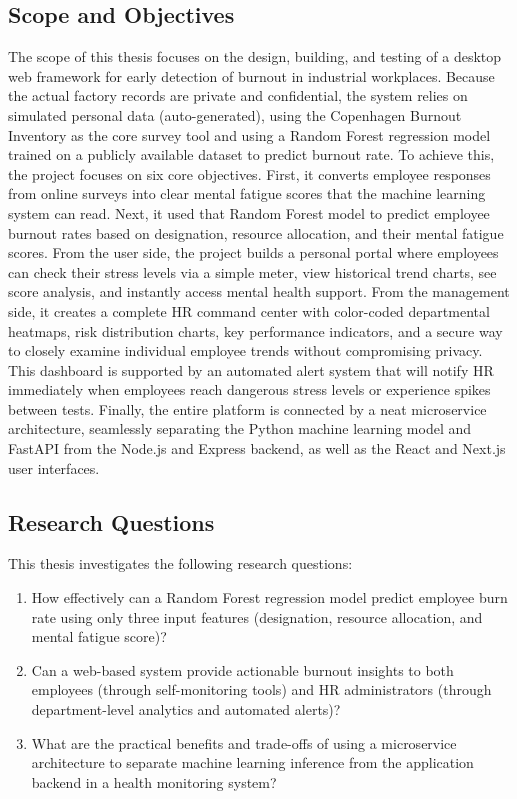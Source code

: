 \documentclass[12pt,a4paper]{article}
\begin{document}
\subsection{Scope and Objectives}

The scope of this thesis focuses on the design, building, and testing of a desktop web framework for early detection of burnout in industrial workplaces. Because the actual factory records are private and confidential, the system relies on simulated personal data (auto-generated), using the Copenhagen Burnout Inventory as the core survey tool and using a Random Forest regression model trained on a publicly available dataset to predict burnout rate. To achieve this, the project focuses on six core objectives. First, it converts employee responses from online surveys into clear mental fatigue scores that the machine learning system can read. Next, it used that Random Forest model to predict employee burnout rates based on designation, resource allocation, and their mental fatigue scores. From the user side, the project builds a personal portal where employees can check their stress levels via a simple meter, view historical trend charts, see score analysis, and instantly access mental health support. From the management side, it creates a complete HR command center with color-coded departmental heatmaps, risk distribution charts, key performance indicators, and a secure way to closely examine individual employee trends without compromising privacy. This dashboard is supported by an automated alert system that will notify HR immediately when employees reach dangerous stress levels or experience spikes between tests. Finally, the entire platform is connected by a neat microservice architecture, seamlessly separating the Python machine learning model and FastAPI from the Node.js and Express backend, as well as the React and Next.js user interfaces.

\subsection{Research Questions}

This thesis investigates the following research questions:

\begin{enumerate}
  \item[\textbf{RQ1.}] How effectively can a Random Forest regression
    model predict employee burn rate using only three input features
    (designation, resource allocation, and mental fatigue score)?

  \item[\textbf{RQ2.}] Can a web-based system provide actionable burnout
    insights to both employees (through self-monitoring tools) and HR
    administrators (through department-level analytics and automated
    alerts)?

  \item[\textbf{RQ3.}] What are the practical benefits and trade-offs of
    using a microservice architecture to separate machine learning
    inference from the application backend in a health monitoring
    system?
\end{enumerate}
\end{document}
